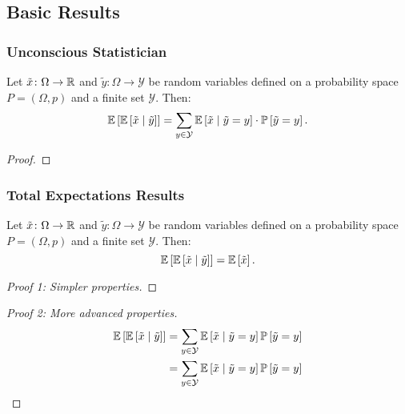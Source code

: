 \subsection{Basic Results}

\subsubsection{Unconscious Statistician }

\begin{theorem} \label{thm:unc_stat_cond}
Let $\tilde{x} \colon \Omega \to \mathbb{R}$ and $\tilde{y} \colon \Omega \to \mathcal{Y}$ be random variables defined on a probability space $P = (\Omega, p)$ and a finite set $\mathcal{Y}$. Then:
\[
  \mathbb{E} \left[ \mathbb{E} \left[ \tilde{x} \mid  \tilde{y} \right] \right]
  =
  \sum_{y\in \mathcal{Y}} \mathbb{E} \left[ \tilde{x} \mid  \tilde{y} = y \right] \cdot
                       \mathbb{P} \left[ \tilde{y} = y \right].
\]
\end{theorem}
\begin{proof}
  
\end{proof}

\subsubsection{Total Expectations Results}

\begin{theorem} \label{thm:total_expect}
Let $\tilde{x} \colon \Omega \to \mathbb{R}$ and $\tilde{y} \colon \Omega \to \mathcal{Y}$ be random variables defined on a probability space $P = (\Omega, p)$ and a finite set $\mathcal{Y}$. Then:
\[
\mathbb{E}\left[\mathbb{E}\left[\tilde{x} \mid  \tilde{y}\right]\right] = \mathbb{E} \left[ \tilde{x} \right].
\]
\end{theorem}
\begin{proof}[Proof 1: Simpler properties]
  
\end{proof}
\begin{proof}[Proof 2: More advanced properties]
\begin{align*}
\mathbb{E}\left[\mathbb{E}\left[\tilde{x} \mid  \tilde{y}\right]\right]
&= \sum_{y\in \mathcal{Y}} \mathbb{E}\left[\tilde{x} \mid  \tilde{y} = y \right] \mathbb{P} \left[ \tilde{y} = y \right]  \\
&= \sum_{y\in \mathcal{Y}} \mathbb{E}\left[\tilde{x} \mid  \tilde{y} = y \right] \mathbb{P} \left[ \tilde{y} = y \right]  \\
\end{align*}
\end{proof}



